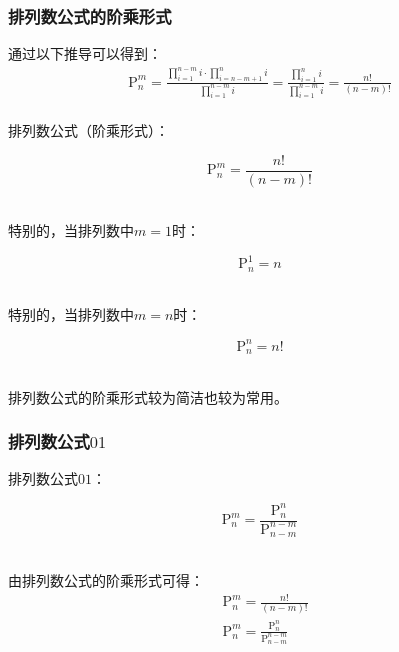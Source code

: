 \documentclass[UTF8]{ctexart}
\newcommand{\Pe}{\mathrm{P}}
\begin{document}
\subsubsection{排列数公式的阶乘形式}
    通过以下推导可以得到：\vspace{5pt}
    \setcounter{equation}{0}
    \begin{align}
        \Pe_n^m
        =\frac{\prod_{i=1}^{n-m}i\cdot\prod_{i=n-m+1}^ni}{\prod_{i=1}^{n-m}i}
        =\frac{\prod_{i=1}^{n}i}{\prod_{i=1}^{n-m}i}
        =\frac{n!}{(n-m)!}
    \end{align}\\
    排列数公式（阶乘形式）：
    \begin{large}
        \begin{equation*}
            \Pe_n^m=\frac{n!}{(n-m)!}
        \end{equation*}
    \end{large}\\
    特别的，当排列数中$m=1$时：
    \begin{large}
        \begin{equation*}
            \Pe_n^1=n
        \end{equation*}
    \end{large}\\
    特别的，当排列数中$m=n$时：
    \begin{large}
        \begin{equation*}
            \Pe_n^n=n!
        \end{equation*}
    \end{large}\\
    排列数公式的阶乘形式较为简洁也较为常用。

\subsubsection{排列数公式$01$}
    排列数公式$01$：
    \begin{large}
        \begin{equation*}
            \Pe_n^m=\frac{\Pe_n^n}{\Pe_{n-m}^{n-m}}
        \end{equation*}
    \end{large}\\
    由排列数公式的阶乘形式可得：
    \setcounter{equation}{0}
    \begin{align}
        &\Pe_n^m=\frac{n!}{(n-m)!}\\[3mm]
        &\Pe_n^m=\frac{\Pe_n^n}{\Pe_{n-m}^{n-m}}
    \end{align}\vspace{1pt}
\end{document}
